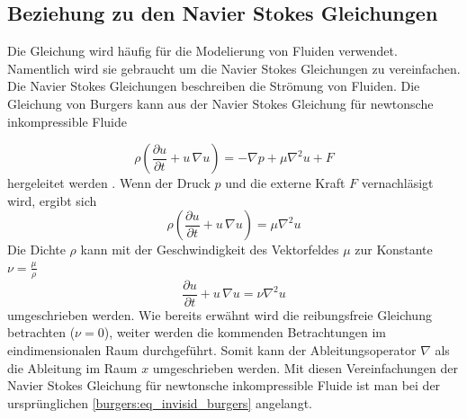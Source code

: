 	\subsection{Beziehung zu den Navier Stokes Gleichungen}
		Die Gleichung wird häufig für die Modelierung von Fluiden verwendet.
		Namentlich wird sie gebraucht um die Navier Stokes Gleichungen zu vereinfachen.
		Die Navier Stokes Gleichungen beschreiben die Str\"omung von Fluiden.
		Die Gleichung von Burgers kann aus der Navier Stokes Gleichung f\"ur newtonsche inkompressible Fluide

		\begin{equation}
			\rho \left(\frac{\partial u}{\partial t} + u \, \nabla u \right) = -\nabla p + \mu \nabla^2 u + F
			\label{burgers:eq_navier}
		\end{equation}
		hergeleitet werden \cite{burgers:navier}.
		Wenn der Druck $p$ und die externe Kraft $F$ vernachl\"asigt wird, ergibt sich
		\begin{equation}
			\rho \left(\frac{\partial u}{\partial t} + u \, \nabla u \right) = \mu \nabla^2 u
			 \label{burgers:eq_navier2}
		\end{equation}
		Die Dichte $\rho$ kann mit der Geschwindigkeit des Vektorfeldes $\mu$ zur Konstante $\nu = \frac{\mu}{\rho}$
		\begin{equation}
			 \frac{\partial u}{\partial t} + u \,\nabla u = \nu \nabla^2 u
			 \label{burgers:eq_navier3}
		\end{equation}
		umgeschrieben werden.
		Wie bereits erw\"ahnt wird die reibungsfreie Gleichung betrachten ($\nu = 0$), weiter werden die kommenden Betrachtungen im eindimensionalen Raum durchgef\"uhrt.
		Somit kann der Ableitungsoperator $\nabla$ als die Ableitung im Raum $x$ umgeschrieben werden.
		Mit diesen Vereinfachungen der Navier Stokes Gleichung f\"ur newtonsche inkompressible Fluide ist man bei der urspr\"unglichen \autoref{burgers:eq_invisid_burgers} angelangt.

